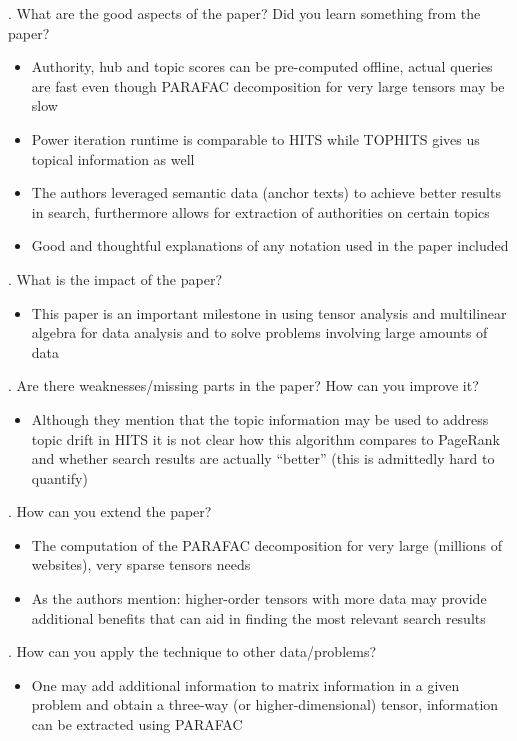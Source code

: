 \documentclass[12pt]{article}
\begin{document}
. What are the good aspects of the paper? Did you learn something from the paper?

\begin{itemize}
    \item Authority, hub and topic scores can be pre-computed offline, actual queries are fast even though PARAFAC decomposition for very large tensors may be slow
    \item Power iteration runtime is comparable to HITS while TOPHITS gives us topical information as well
    \item The authors leveraged semantic data (anchor texts) to achieve better results in search, furthermore allows for extraction of authorities on certain topics
    \item Good and thoughtful explanations of any notation used in the paper included
\end{itemize}

. What is the impact of the paper?

\begin{itemize}
    \item This paper is an important milestone in using tensor analysis and multilinear algebra for data analysis and to solve problems involving large amounts of data
\end{itemize}

. Are there weaknesses/missing parts in the paper? How can you improve it?

\begin{itemize}
    \item Although they mention that the topic information may be used to address topic drift in HITS it is not clear how this algorithm compares to PageRank and whether search results are actually ``better'' (this is admittedly hard to quantify)
\end{itemize}

. How can you extend the paper?

\begin{itemize}
    \item The computation of the PARAFAC decomposition for very large (millions of websites), very sparse tensors needs 
    \item As the authors mention: higher-order tensors with more data may provide additional benefits that can aid in finding the most relevant search results
\end{itemize}

. How can you apply the technique to other data/problems?

\begin{itemize}
    \item One may add additional information to matrix information in a given problem and obtain a three-way (or higher-dimensional) tensor, information can be extracted using PARAFAC 
\end{itemize}
\end{document}
